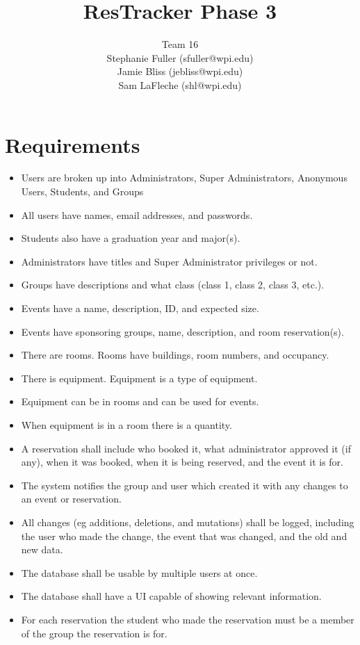 \documentclass{article}
\title{ResTracker Phase 3}
\author{Team 16\\Stephanie Fuller (sfuller@wpi.edu)\\Jamie Bliss (jebliss@wpi.edu)\\Sam
LaFleche (shl@wpi.edu)}
\begin{document}
\maketitle

\section{Requirements}

\begin{itemize}
\item Users are broken up into Administrators, Super Administrators, Anonymous Users, Students, and Groups
\item All users have names, email addresses, and passwords.
\item Students also have a graduation year and major(s).
\item Administrators have titles and Super Administrator privileges or not. 
\item Groups have descriptions and what class (class 1, class 2, class 3, etc.).
\item Events have a name, description, ID, and expected size.
\item Events have sponsoring groups, name, description, and room reservation(s).
\item There are rooms. Rooms have buildings, room numbers, and occupancy.
\item There is equipment. Equipment is a type of equipment.
\item Equipment can be in rooms and can be used for events.
\item When equipment is in a room there is a quantity.
\item A reservation shall include who booked it, what administrator
approved it (if any), when it was booked, when it is being reserved,
and the event it is for.
\item The system notifies the group and user which created it with any
changes to an event or reservation.
\item All changes (eg additions, deletions, and mutations) shall be
logged, including the user who made the change, the event that was
changed, and the old and new data.
\item The database shall be usable by multiple users at once.
\item The database shall have a UI capable of showing relevant information.
\item For each reservation the student who made the reservation must
be a member of the group the reservation is for.

\end{itemize}
\end{document}
